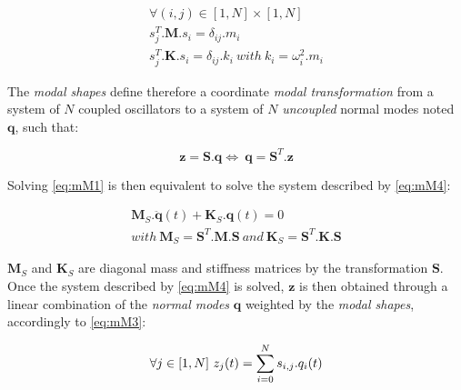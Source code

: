 {{{{{$$
\begin{array}{c}
	\forall (i, j) \in [1, N]\times[1, N] \\
	s_j^T . \boldsymbol{M} . s_i = \delta_{ij} . m_i \\
	s_j^T . \boldsymbol{K} . s_i = \delta_{ij} . k_i\ with\ k_i = \omega_i^2 . m_i
\end{array}
$$

The \emph{modal shapes} define therefore a coordinate \emph{modal transformation} from a system of $N$ coupled oscillators to a system of $N$ \emph{uncoupled} normal modes noted $\boldsymbol{q}$, such that:

\begin{equation}
	\boldsymbol{z} = \boldsymbol{S} . \boldsymbol{q} \Leftrightarrow \ \boldsymbol{q} = \boldsymbol{S}^T . \boldsymbol{z} \label{eq:mM3}
\end{equation}

Solving \myequname \eqref{eq:mM1} is then equivalent to solve the system described by \myequname \eqref{eq:mM4}:

\begin{eqnarray}
	\boldsymbol{M}_S . \ddot{\boldsymbol{q}}(t) + \boldsymbol{K}_S . \boldsymbol{q}(t) = 0 \label{eq:mM4} \\
	with\ \boldsymbol{M}_S = \boldsymbol{S}^T . \boldsymbol{M} . \boldsymbol{S}\ and\ \boldsymbol{K}_S = \boldsymbol{S}^T . \boldsymbol{K} . \boldsymbol{S} \nonumber
\end{eqnarray}

$\boldsymbol{M}_S$ and $\boldsymbol{K}_S$ are diagonal mass and stiffness matrices by the transformation $\boldsymbol{S}$. Once the system described by \myequname \eqref{eq:mM4} is solved, $\boldsymbol{z}$ is then obtained through a linear combination of the \emph{normal modes} $\boldsymbol{q}$ weighted by the \emph{modal shapes}, accordingly to \myequname \eqref{eq:mM3}:

$$
	\forall j \in [1, N]\ z_j(t) = \sum_{i = 0}^{N} s_{i, j} . q_i(t) \\
$$

\newpage

}}}}}
